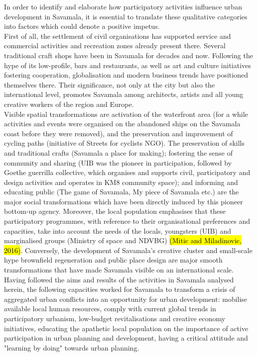 \documentclass[11pt]{report}
\begin{document}
In order to identify and elaborate how participatory activities influence urban development in Savamala, it is essential to translate these qualitative categories into factors which could denote a positive impetus.
\\
First of all, the settlement of civil organisations has supported service and commercial activities and recreation zones already present there. Several traditional craft shops have been in Savamala for decades and now. Following the hype of its low-profile, bars and restaurants, as well as art and culture initiatives fostering cooperation, globalisation and modern business trends have positioned themselves there. Their significance, not only at the city but also the international level, promotes Savamala among architects, artists and all young creative workers of the region and Europe.
\\
Visible spatial transformations are activation of the waterfront area (for a while activities and events were organised on the abandoned ships on the Savamala coast before they were removed), and the preservation and improvement of cycling paths (initiative of Streets for cyclists NGO). The preservation of skills and traditional crafts (Savamala a place for making); fostering the sense of community and sharing (UIB was the pioneer in participation, followed by Goethe guerrilla collective, which organises and supports civil, participatory and design activities and operates in KM8 community space); and informing and educating public (The game of Savamala, My piece of Savamala etc.) are the major social transformations which have been directly induced by this pioneer bottom-up agency. Moreover, the local population emphasises that these participatory programmes, with reference to their organisational preferences and capacities, take into account the needs of the locals, youngsters (UIB) \cite{(Müller-Wieferig and Herzen, 2013)} and marginalised groups (Ministry of space and NDVBG) \hl{(Mitic and Miladinovic, 2016)}. Conversely, the development of Savamala’s creative cluster and small-scale hype brownfield regeneration and public place design are major smooth transformations that have made Savamala visible on an international scale.
\\
Having followed the aims and results of the activities in Savamala analysed herein, the following capacities worked for Savamala to transform a crisis of aggregated urban conflicts into an opportunity for urban development: mobilise available local human resources, comply with current global trends in participatory urbanism, low-budget revitalisations and creative economy initiatives, educating the apathetic local population on the importance of active participation in urban planning and development, having a critical attitude and "learning by doing" towards urban planning.
\end{document}
